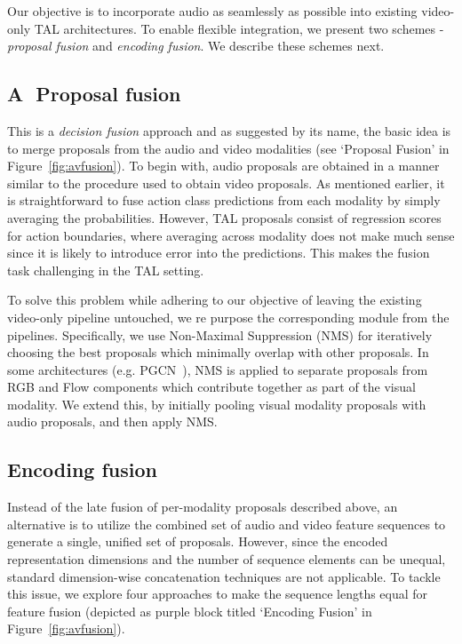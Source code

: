 \documentclass[10pt,twocolumn,letterpaper]{article}
\begin{document}
 Our objective is to incorporate audio as seamlessly as possible into existing video-only TAL architectures. To enable flexible integration, we present two schemes - \textit{proposal fusion} and \textit{encoding fusion}. We describe these schemes next.

\subsection{ \textcircled{A} Proposal fusion} 
\label{sec:propfusion}

This is a \textit{decision fusion} approach and as suggested by its name, the basic idea is to merge proposals from the audio and video modalities (see `Proposal Fusion' in Figure~\ref{fig:avfusion}). To begin with, audio proposals are obtained in a manner similar to the procedure used to obtain video proposals. As mentioned earlier, it is straightforward to fuse action class predictions from each modality by simply averaging the probabilities. However, TAL proposals consist of regression scores for action boundaries, where averaging across modality does not make much sense since it is likely to introduce error into the predictions. This makes the fusion task challenging in the TAL setting. 

To solve this problem while adhering to our objective of leaving the existing video-only pipeline untouched, we re purpose the corresponding module from the pipelines. Specifically, we use Non-Maximal Suppression (NMS) for iteratively choosing the best proposals which minimally overlap with other proposals. In some architectures (e.g. PGCN~\cite{PGCN2019ICCV}), NMS is applied to separate proposals from RGB and Flow components which contribute together as part of the visual modality. We extend this, by initially pooling visual modality proposals with audio proposals, and then apply NMS.

\subsection{ \raisebox{.5pt}{\textcircled{\raisebox{-1.01pt} {B}}} Encoding fusion}
\label{sec:encfusion}

Instead of the late fusion of per-modality proposals described above, an alternative is to utilize the combined set of audio  and video feature sequences  to generate a single, unified set of proposals. However, since the encoded representation dimensions  and the number of sequence elements  can be unequal, standard dimension-wise concatenation techniques are not applicable. To tackle this issue, we explore four approaches to make the sequence lengths equal for feature fusion (depicted as purple block titled `Encoding Fusion' in Figure~\ref{fig:avfusion}). 
\end{document}
